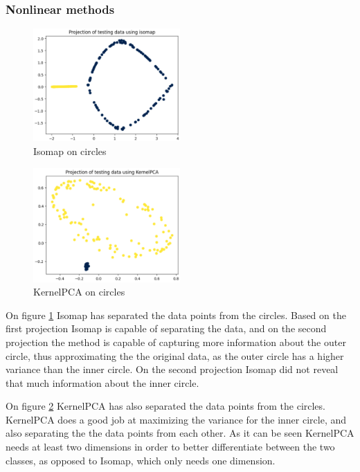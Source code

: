 \subsubsection{Nonlinear methods}

\begin{figure}[h]
    \centering
    \includegraphics[width=0.5\textwidth]{figures/theory-example-figures/circles-isomap.png}
    \caption{Isomap on circles}
    \label{fig:circles-isomap}
    \end{figure}

    \begin{figure}[h]
        \centering
        \includegraphics[width=0.5\textwidth]{figures/theory-example-figures/circles-kernelpca.png}
        \caption{KernelPCA on circles}
        \label{fig:circles-kernelpca}
        \end{figure}
    
On figure \ref{fig:circles-isomap} Isomap has separated the data points from the circles. Based on the first projection Isomap is capable of separating the data, and on the second projection the method is capable of capturing more information about the outer circle, thus approximating the the original data, as the outer circle has a higher variance than the inner circle. On the second projection Isomap did not reveal that much information about the inner circle.


On figure \ref{fig:circles-kernelpca} KernelPCA has also separated the data points from the circles. KernelPCA does a good job at maximizing the variance for the inner circle, and also separating the the data points from each other. As it can be seen KernelPCA needs at least two dimensions in order to better differentiate between the two classes, as opposed to Isomap, which only needs one dimension.



